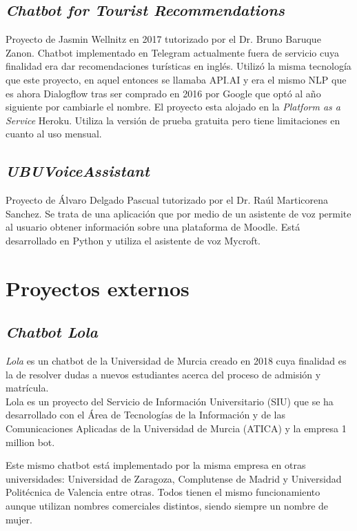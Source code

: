 \subsection{\emph{Chatbot for Tourist Recommendations}}

Proyecto de Jasmin Wellnitz en 2017 tutorizado por el Dr. Bruno Baruque Zanon. 
Chatbot implementado en Telegram actualmente fuera de servicio cuya finalidad era dar recomendaciones turísticas en inglés.
Utilizó la misma tecnología que este proyecto, en aquel entonces se llamaba API.AI y era el mismo NLP que es ahora Dialogflow tras ser comprado en 2016 por Google que optó al año siguiente por cambiarle el nombre.
El proyecto esta alojado en la \textit{Platform as a Service} Heroku. Utiliza la versión de prueba gratuita pero tiene limitaciones en cuanto al uso mensual. \cite{ChatbotTourist}


\subsection{\emph{UBUVoiceAssistant}}


Proyecto de Álvaro Delgado Pascual tutorizado por el Dr. Raúl Marticorena Sanchez.
Se trata de una aplicación que por medio de un asistente de voz permite al usuario obtener información sobre una plataforma de Moodle. Está desarrollado en Python y utiliza el asistente de voz Mycroft. \cite{UBUVoiceAssistant}

\newpage
\section{Proyectos externos}

\subsection{\emph{Chatbot Lola}}

\textit{Lola} es un chatbot de la Universidad de Murcia creado en 2018 cuya finalidad es la de resolver dudas a nuevos estudiantes acerca del proceso de admisión y matrícula.\\
Lola es un proyecto del Servicio de  Información Universitario (SIU) que se ha desarrollado con el Área de Tecnologías de la Información y de las Comunicaciones Aplicadas de la Universidad de Murcia (ATICA) y la empresa 1 million bot. \cite{Lola}\\


Este mismo chatbot está implementado por la misma empresa en otras universidades: Universidad de Zaragoza, Complutense de Madrid y Universidad Politécnica de Valencia entre otras. Todos tienen el mismo funcionamiento aunque utilizan nombres comerciales distintos, siendo siempre un nombre de mujer.